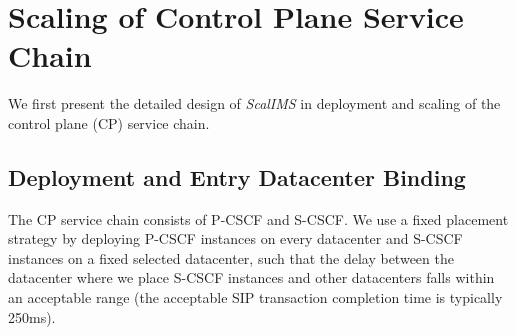 \section{Scaling of Control Plane Service Chain}
\label{sec:scalims-cp}
We first present the detailed design of \textit{ScalIMS} in deployment and scaling of the control plane (CP) service chain. %

\subsection{Deployment and Entry Datacenter Binding} \label{System-Design}

The CP service chain consists of P-CSCF and S-CSCF. We use a fixed placement strategy by deploying P-CSCF instances on every datacenter and S-CSCF instances on a fixed selected datacenter, such that the delay between the datacenter where we place S-CSCF instances and other datacenters falls within an acceptable range (the acceptable SIP transaction completion time is typically 250ms).

